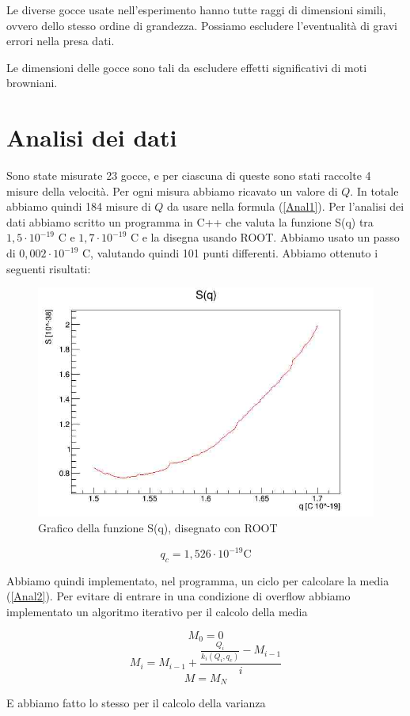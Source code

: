 \documentclass{article}
\begin{document}
Le diverse gocce usate nell'esperimento hanno tutte raggi di dimensioni simili, ovvero dello stesso ordine di grandezza. Possiamo escludere l'eventualità di gravi errori nella presa dati.

Le dimensioni delle gocce sono tali da escludere effetti significativi di moti browniani.

\section{Analisi dei dati}

Sono state misurate 23 gocce, e per ciascuna di queste sono stati raccolte 4 misure della velocità. Per ogni misura abbiamo ricavato un valore di $Q$. In totale abbiamo quindi 184 misure di $Q$ da usare nella formula (\ref{Anal1}). Per l'analisi dei dati abbiamo scritto un programma in C++ che valuta la funzione S(q) tra $1,5 \cdot 10^{-19}$ C e $1,7 \cdot 10^{-19}$ C e la disegna usando ROOT. Abbiamo usato un passo di $0,002 \cdot 10^{-19}$ C, valutando quindi 101 punti differenti. Abbiamo ottenuto i seguenti risultati:

\begin{figure}[h]
\centering
\includegraphics[width=0.8\linewidth]{Sq}
\caption{Grafico della funzione S(q), disegnato con ROOT}
\end{figure}

\[q_c = 1,526 \cdot 10^{-19} \textrm{C}\]

Abbiamo quindi implementato, nel programma, un ciclo per calcolare la media (\ref{Anal2}). Per evitare di entrare in una condizione di overflow abbiamo implementato un algoritmo iterativo per il calcolo della media

\[M_0 = 0\]
\[M_i = M_{i-1} + \frac{\frac{Q_i}{k_i(Q_i,q_c)} - M_{i-1}}{i}\]
\[M=M_N\]

E abbiamo fatto lo stesso per il calcolo della varianza
\end{document}
